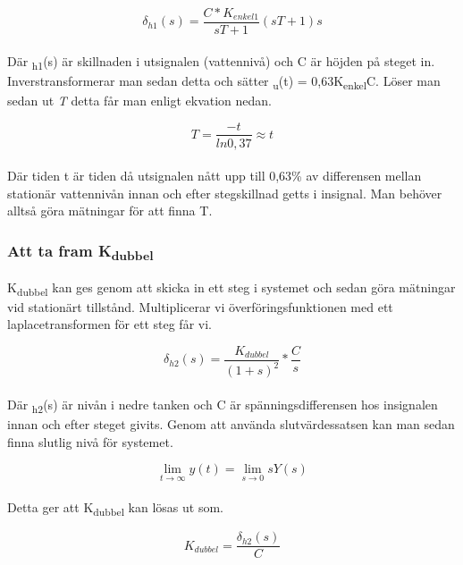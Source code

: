 \documentclass{article}
\begin{document}
\begin{equation}
\delta_{h1}(s) = \frac{C * K_{enkel1}}{sT+1}{(sT+1)s}
\end{equation}
\\
Där \textdelta\textsubscript{h1}(s) är skillnaden i utsignalen (vattennivå) och C är höjden på steget in. Inverstransformerar man sedan detta och sätter \textdelta\textsubscript{u}(t) = 0,63K\textsubscript{enkel}C. Löser man sedan ut {\itshape T} detta får man enligt ekvation nedan. 

\begin{equation}
T = \frac{-t}{ln{0,37}} \approx t
\end{equation}
\\
Där tiden t är tiden då utsignalen nått upp till 0,63\% av differensen mellan stationär vattennivån innan och efter stegskillnad getts i insignal. Man behöver alltså göra mätningar för att finna T. 
\\



\subsubsection{Att ta fram K\textsubscript{dubbel}}
K\textsubscript{dubbel} kan ges genom att skicka in ett steg i systemet och sedan göra mätningar vid stationärt tillstånd. Multiplicerar vi överföringsfunktionen med ett laplacetransformen för ett steg får vi. 

\begin{equation}
\delta_{h2}(s) = \frac{K_{dubbel}}{(1+s)^2}*\frac{C}{s}
\end{equation}
\\
Där \textdelta\textsubscript{h2}(s) är nivån i nedre tanken och C är spänningsdifferensen hos insignalen innan och efter steget givits. Genom att använda slutvärdessatsen kan man sedan finna slutlig nivå för systemet. 

\begin{equation}
\lim\limits_{t \to \infty}y(t) = \lim\limits_{s \to 0}sY(s)
\end{equation}
\\
Detta ger att K\textsubscript{dubbel} kan lösas ut som. 

\begin{equation}
K_{dubbel} = \frac{\delta_{h2}(s)}{C}
\end{equation}
\\


\end{document}
